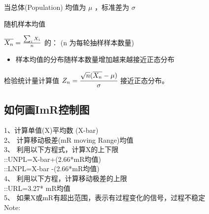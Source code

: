 当总体(Population) 均值为 \(\mu\) ，标准差为 \(\sigma\)

\begin{description}
\tightlist
\item[]
随机样本均值
\end{description}

\(\overline{X_n} = {\sum_i X_i \over n}\) 的： (n 为每轮抽样样本数量)

\begin{description}
\item[]
\end{description}

\begin{itemize}
\tightlist
\item
  样本均值的分布随样本数量增加越来越接近正态分布
\end{itemize}

检验统计量计算值
\(Z_n = \cfrac{ \sqrt{n}(\overline{X_n} - \mu) }{\sigma}\)
接近正态分布。\\

\hypertarget{ux5982ux4f55ux753bimrux63a7ux5236ux56fe}{%
\subsection{如何画ImR控制图}\label{ux5982ux4f55ux753bimrux63a7ux5236ux56fe}}

1、计算单值(X)平均数 (X-bar)\\
2、 计算移动极差(mR moving Range)均值\\
3、 利用以下方程式，计算X的上下限\\
::UNPL=X-bar+(2.66*mR均值)\\
::LNPL=X-bar -(2.66*mR均值)\\
4、 利用以下方程，计算移动极差的上限\\
::URL=3.27* mR均值\\
5、 如果X或mR有超出范围，表示有过程变化的信号，过程不稳定\\
Note:

\begin{description}
\item[]
\end{description}

